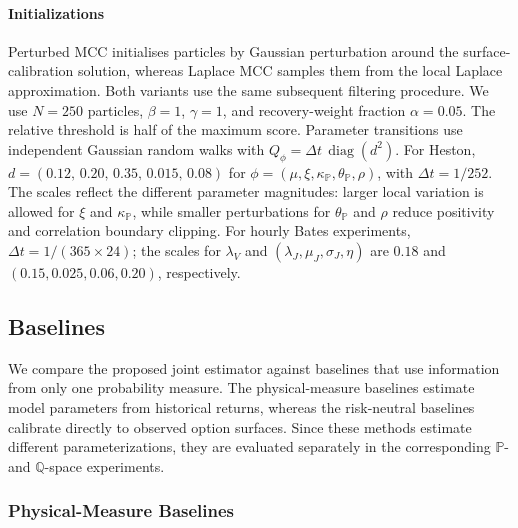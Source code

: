 \documentclass[sigconf,anonymous,review]{acmart}
\begin{document}
\paragraph{Initializations}

Perturbed MCC initialises particles by Gaussian perturbation around the
surface-calibration solution, whereas Laplace MCC samples them from the
local Laplace approximation. Both variants use the same subsequent
filtering procedure. We use \(N=250\) particles, \(\beta=1\), \(\gamma=1\), and
recovery-weight fraction \(\alpha=0.05\).  The relative threshold is half of the maximum score. Parameter transitions use independent Gaussian random walks with
\(
Q_{\phi}=\Delta t\,\operatorname{diag}(d^2)
\).
For Heston,
\newline
\(
d=(0.12,\,0.20,\,0.35,\,0.015,\,0.08)
\)
for
\(
\phi=(\mu,\xi,\kappa_{\mathbb P},\theta_{\mathbb P},\rho)
\),
with \(\Delta t=1/252\). The scales reflect the different parameter
magnitudes: larger local variation is allowed for \(\xi\) and
\(\kappa_{\mathbb P}\), while smaller perturbations for
\(\theta_{\mathbb P}\) and \(\rho\) reduce positivity and correlation
boundary clipping. For hourly Bates experiments, \(\Delta t=1/(365\times24)\);
the scales for \(\lambda_V\) and
\((\lambda_J,\mu_J,\sigma_J,\eta)\) are
\(0.18\) and \((0.15,0.025,0.06,0.20)\), respectively.

\subsection{Baselines}
\label{sec:baselines}

We compare the proposed joint estimator against baselines that use information from only one probability measure. The physical-measure baselines estimate model parameters from historical returns, whereas the risk-neutral baselines calibrate directly to observed option surfaces. Since these methods estimate different parameterizations, they are evaluated separately in the corresponding \(\mathbb{P}\)- and \(\mathbb{Q}\)-space experiments.

\subsubsection{Physical-Measure Baselines}
\end{document}

